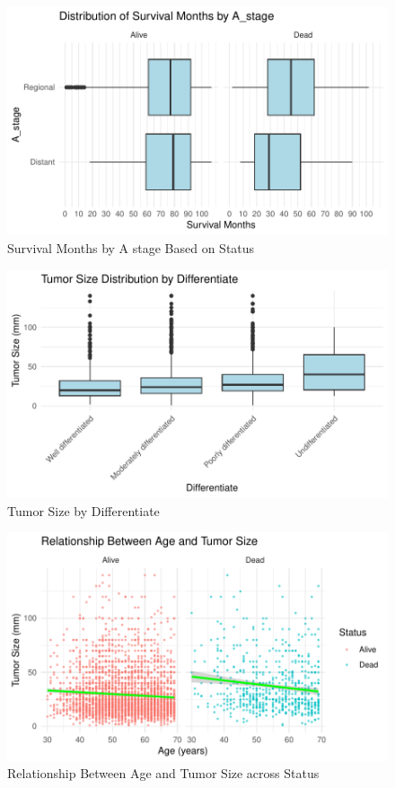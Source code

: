 \documentclass[
]{article}
\begin{document}
\begin{figure}
\includegraphics[width=0.9\linewidth]{Appendix_files/figure-latex/survival_months_by_a_stage_based_on_status-1} \caption{Survival Months by A stage Based on Status}\label{fig:survival_months_by_a_stage_based_on_status}
\end{figure}

\begin{figure}
\includegraphics[width=0.9\linewidth]{Appendix_files/figure-latex/tumor_size_by_differentiate-1} \caption{Tumor Size by Differentiate}\label{fig:tumor_size_by_differentiate}
\end{figure}

\begin{figure}
\includegraphics[width=0.9\linewidth]{Appendix_files/figure-latex/relationship_between_age_and_tumor_size_across_status-1} \caption{Relationship Between Age and Tumor Size across Status}\label{fig:relationship_between_age_and_tumor_size_across_status}
\end{figure}
\end{document}
